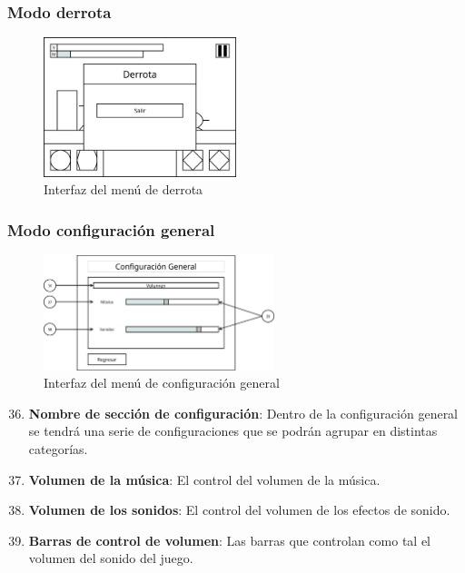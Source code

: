 \subsubsection{Modo derrota}
\begin{figure}[H]
    \centering
    \includegraphics[width=0.5\textwidth]{5-Cuerpo/Chapter5/5.5/I9.png} %
    \caption{Interfaz del menú de derrota}
    \label{fig:Interface_Derrota}
\end{figure}


\subsubsection{Modo configuración general}
\begin{figure}[H]
    \centering
    \includegraphics[width=0.6\textwidth]{5-Cuerpo/Chapter5/5.5/I10.png} %
    \caption{Interfaz del menú de configuración general}
    \label{fig:Interface_Configuracion_General}
\end{figure}
\begin{enumerate}\setcounter{enumi}{35}
    \item \textbf{Nombre de sección de configuración}: Dentro de la
    configuración general se tendrá una serie de configuraciones que se podrán
    agrupar en distintas categorías.
    \item \textbf{Volumen de la música}: El control del volumen de la música.
    \item \textbf{Volumen de los sonidos}: El control del volumen de los efectos
    de sonido.
    \item \textbf{Barras de control de volumen}: Las barras que controlan como
    tal el volumen del sonido del juego.
\end{enumerate}
